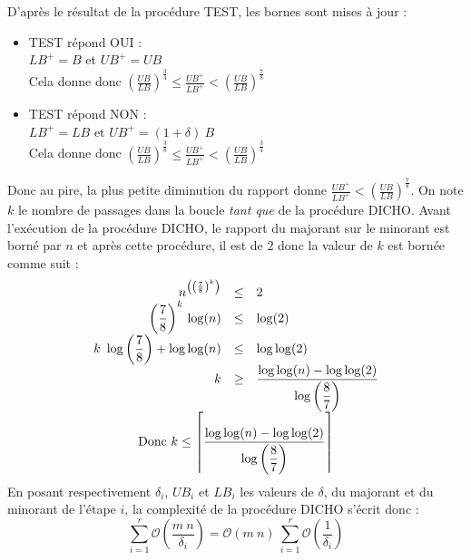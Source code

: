 \documentclass[10pt,francais]{llncs}
\begin{document}
{\noindent D'apr\`es le r\'esultat de la proc\'edure TEST, les bornes sont mises \`a jour :
\begin{itemize}
\item TEST r\'epond OUI :\\
$LB^+ = B$ et $UB^+ = UB$\\[0.1cm]
Cela donne donc $\displaystyle \left(\frac{UB}{LB}\right)^\frac{3}{4} \leq \frac{{UB}^+}{{LB}^+} < \left(\frac{UB}{LB}\right)^\frac{7}{8}$
~\\
\item TEST r\'epond NON :\\
$LB^+ = LB$ et $UB^+ = (1+\delta)\ B$\\[0.1cm]
Cela donne donc $\displaystyle \left(\frac{UB}{LB}\right)^\frac{3}{8} \leq \frac{{UB}^+}{{LB}^+} < \left(\frac{UB}{LB}\right)^\frac{3}{4}$
\end{itemize}
Donc au pire, la plus petite diminution du rapport donne $\displaystyle \frac{{UB}^+}{{LB}^+} < \left(\frac{UB}{LB}\right)^\frac{7}{8}$.
On note $k$ le nombre de passages dans la boucle \textit{tant que} de la proc\'edure DICHO. Avant l'ex\'ecution de la proc\'edure DICHO, le rapport du majorant sur le minorant est born\'e par $n$ et apr\`es cette proc\'edure, il est de $2$ donc la valeur de $k$ est born\'ee comme suit :
$$
\begin{array}{rcl}
 \displaystyle n^{\left(\left(\frac{7}{8}\right)^k\right)} & \leq & 2\\
 \displaystyle \left(\frac{7}{8}\right)^k\, \log(n) & \leq & \log(2)\\
 \displaystyle k\ \log\left(\frac{7}{8}\right)+ \log\log(n) & \leq & \log\log(2)\\
 \displaystyle k & \geq & \displaystyle \frac{\log\log(n)-\log\log(2)}{\displaystyle \log\left(\frac{8}{7}\right)}\\
 \multicolumn{3}{c}{\displaystyle \textrm{Donc}\ k \leq \left\lceil \frac{\log\log(n)-\log\log(2)}{\displaystyle \log\left(\frac{8}{7}\right)} \right\rceil}
\end{array}
$$
En posant respectivement $\delta_i$, $UB_i$ et $LB_i$ les valeurs de $\delta$, du majorant et du minorant de l'\'etape $i$, la complexit\'e de la proc\'edure DICHO s'\'ecrit donc :
$$\displaystyle \sum_{i=1}^r \mathcal{O}\left(\frac{m\ n}{\delta_i}\right) = \mathcal{O}(m\ n)\ \sum_{i=1}^r \mathcal{O}\left(\frac{1}{\delta_i}\right)$$

}
\end{document}
